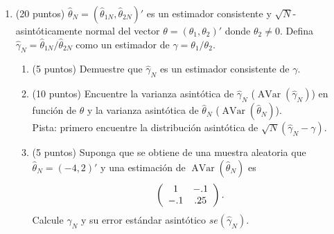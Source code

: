 \documentclass[letterpaper,11pt]{article}
\theoremstyle{plain}
\theoremstyle{definition}
\theoremstyle{remark}
\DeclareMathOperator{\Avar}{AVar}
\begin{document}
\begin{enumerate}
    \item (20 puntos) $\hat \theta_N=(\hat \theta_{1N}, \hat \theta_{2N})'$ es un estimador
        consistente y $\sqrt{N}$-asint\'oticamente normal del vector
        $\theta=(\theta_{1},\theta_{2})'$ donde $\theta_{2} \neq 0$. Defina
        $\hat \gamma_N=\hat \theta_{1N}/\hat \theta_{2N}$ como un estimador de
        $\gamma=\theta_{1}/\theta_{2}$.
        \begin{enumerate}
            \item (5 puntos) Demuestre que $\hat \gamma_N$ es un estimador consistente de $\gamma$.
            \item (10 puntos) Encuentre la varianza asint\'otica de $\hat \gamma_N$
                ($\Avar(\hat \gamma_N)$) en funci\'on de $\theta$ y la varianza asint\'otica de
                $\hat \theta_N$ ($\Avar(\hat \theta_N)$). \\
                Pista: primero encuentre la distribuci\'on asint\'otica de
                $\sqrt{N}(\hat \gamma_N-\gamma)$.
            \item (5 puntos) Suponga que se obtiene de una muestra aleatoria que
                $\hat \theta_N=(-4, 2)'$ y una estimaci\'on de $\Avar(\hat \theta_N)$ es
                \begin{align*}
                \left(
                \begin{array} {c c}
                1   & -.1 \\
                -.1 & .25
                \end{array}
                \right).
                \end{align*}
                Calcule $\hat \gamma_N$ y su error est\'andar asint\'otico $se(\hat \gamma_N)$.
        \end{enumerate}

\end{enumerate}
\end{document}
